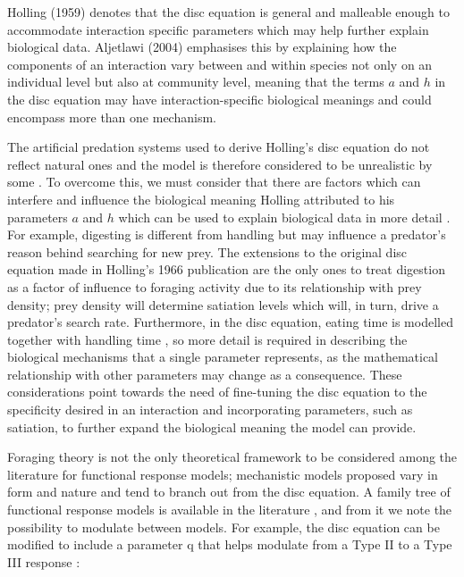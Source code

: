 \documentclass[11pt]{article}
\begin{document}
  Holling (1959) \cite{Holling1959} denotes that the disc equation is general and malleable enough to accommodate interaction specific parameters which may help further explain biological data. Aljetlawi (2004) \cite{Aljetlawi2004} emphasises this by explaining how the components of an interaction vary between and within species not only on an individual level but also at community level, meaning that the terms $a$ and $h$ in the disc equation may have interaction-specific biological meanings and could encompass more than one mechanism.
  
  The artificial predation systems used to derive Holling’s disc equation do not reflect natural ones and the model is therefore considered to be unrealistic by some \cite{Jeschke2002}. To overcome this, we must consider that there are factors which can interfere and influence the biological meaning Holling attributed to his parameters $a$ and $h$ which can be used to explain biological data in more detail \cite{Aljetlawi2004}. For example, digesting is different from handling but may influence a predator's reason behind searching for new prey. The extensions to the original disc equation made in Holling's 1966 publication \cite{Holling1966} are the only ones to treat digestion as a factor of influence to foraging activity due to its relationship with prey density; prey density will determine satiation levels which will, in turn, drive a predator’s search rate. Furthermore, in the disc equation, eating time is modelled together with handling time \cite{Jeschke2002}, so more detail is required in describing the biological mechanisms that a single parameter represents, as the mathematical relationship with other parameters may change as a consequence. These considerations point towards the need of fine-tuning the disc equation to the specificity desired in an interaction and incorporating parameters, such as satiation, to further expand the biological meaning the model can provide. 
  
  Foraging theory is not the only theoretical framework to be considered among the literature for functional response models; mechanistic models proposed vary in form and nature and tend to branch out from the disc equation. A family tree of functional response models is available in the literature \cite{Jeschke2002}, and from it we note the possibility to modulate between models. For example, the disc equation can be modified to include a parameter q that helps modulate from a Type II to a Type III response \cite{Real1977,Real1979}:
  
\end{document}
